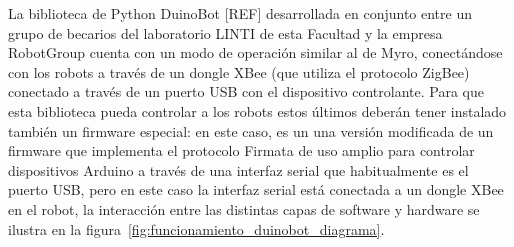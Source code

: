 La biblioteca de Python DuinoBot [REF] desarrollada en conjunto entre un grupo
de becarios del laboratorio LINTI de esta Facultad y la empresa RobotGroup
cuenta con un modo de operación similar al de Myro, conectándose con
los robots a través de un dongle XBee (que utiliza el protocolo ZigBee)
conectado a través de un puerto USB con el dispositivo controlante.
Para que esta biblioteca pueda controlar a los robots estos últimos
deberán tener instalado también un firmware especial: en este caso,
es un una versión modificada de un firmware que implementa el protocolo
Firmata de uso amplio para controlar dispositivos Arduino a través de una
interfaz serial que habitualmente es el puerto USB, pero en este caso
la interfaz serial está conectada a un dongle XBee en el robot, la interacción
entre las distintas capas de software y hardware se ilustra en la
figura~\ref{fig:funcionamiento_duinobot_diagrama}.

